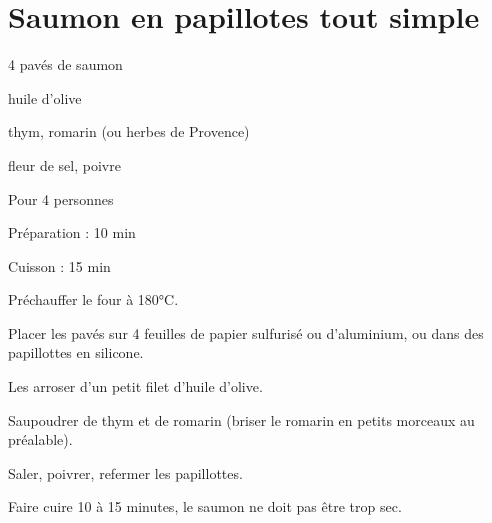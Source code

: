 \section{Saumon en papillotes tout simple}

\begin{ingredients}
\item 4 pavés de saumon
\item huile d'olive
\item thym, romarin (ou herbes de Provence)
\item fleur de sel, poivre
\end{ingredients}
\begin{infos}
\item Pour 4 personnes		%
\item Préparation : 10 min		%
\item Cuisson : 15 min			%
\end{infos}
\begin{etapes}
\item Préchauffer le four à 180°C.
\item Placer les pavés sur 4 feuilles de papier sulfurisé ou d'aluminium, ou dans des papillottes en silicone.
\item Les arroser d'un petit filet d'huile d'olive.
\item Saupoudrer de thym et de romarin (briser le romarin en petits morceaux au préalable).
\item Saler, poivrer, refermer les papillottes.
\item Faire cuire 10 à 15 minutes, le saumon ne doit pas être trop sec.
\end{etapes}
\begin{conseils}
\end{conseils}